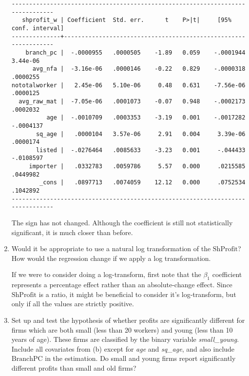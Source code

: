 \documentclass[11pt,twoside,openany]{memoir}
\begin{document}
\begin{question}
\begin{enumerate}[label = (\alph*),itemsep=1pt,topsep=3pt]
{\begin{solution}
\begin{Verbatim}[fontsize=\footnotesize]
-------------------------------------------------------------------------------
   shprofit_w | Coefficient  Std. err.      t    P>|t|     [95% conf. interval]
--------------+----------------------------------------------------------------
    branch_pc |  -.0000955   .0000505    -1.89   0.059    -.0001944    3.44e-06
      avg_nfa |  -3.16e-06   .0000146    -0.22   0.829    -.0000318    .0000255
nototalworker |   2.45e-06   5.10e-06     0.48   0.631    -7.56e-06    .0000125
  avg_raw_mat |  -7.05e-06   .0001073    -0.07   0.948    -.0002173    .0002032
          age |  -.0010709   .0003353    -3.19   0.001    -.0017282   -.0004137
       sq_age |   .0000104   3.57e-06     2.91   0.004     3.39e-06    .0000174
       listed |  -.0276464   .0085633    -3.23   0.001     -.044433   -.0108597
     importer |   .0332783   .0059786     5.57   0.000     .0215585    .0449982
        _cons |   .0897713   .0074059    12.12   0.000     .0752534    .1042892
-------------------------------------------------------------------------------
                \end{Verbatim}
                The sign has not changed. Although the coefficient is still not statistically significant, it is much closer than before.
            \end{solution}}
        \item Would it be appropriate to use a natural log transformation of the $\text{ShProfit}$? How would the regression change if we apply a log transformation.
            {\color{blue} \begin{solution}
                If we were to consider doing a log-transform, first note that the $\beta_1$ coefficient represents a percentage effect rather than an absolute-change effect. Since $\text{ShProfit}$ is a ratio, it might be beneficial to consider it's log-transform, but only if all the values are strictly positive.
            \end{solution}}
        \item Set up and test the hypothesis of whether profits are significantly different for firms which are both small (less than 20 workers) and young (less than 10 years of age). These firms are classified by the binary variable \textit{small\_young}. Include all covariates from (b) except for \textit{age} and \textit{sq\_age}, and also include $\text{BranchPC}$ in the estimation. Do small and young firms report significantly different profits than small and old firms? 

\end{enumerate}
\end{question}
\end{document}
